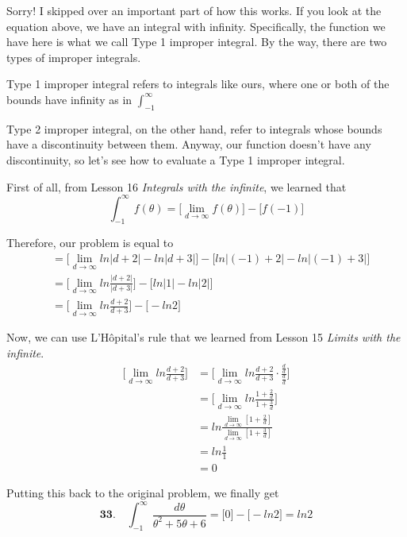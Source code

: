 Sorry! I skipped over an important
part of how this works. If you look at
the equation above, we have an integral
with infinity. Specifically,
the function we have here is what
we call Type 1 improper integral.
By the way, there are two types of
improper integrals. 

Type 1 improper
integral refers to integrals like
ours, where one or both of the bounds
have infinity as in $ \int_{-1}^{\infty} $

Type 2 improper integral, on the other hand,
refer to integrals whose bounds
have a discontinuity between them.
Anyway, our function doesn't have any
discontinuity, so let's see how to
evaluate a Type 1 improper integral.

First of all, from Lesson 16
\textit{Integrals with the infinite},
we learned that
\begin{equation}
    \int_{-1}^{\infty} f(\theta) =
	\Big[    
	  \lim_{d \to \infty} f(\theta)
	\Big]
	- 
	\Big[ 
	  f(-1)
	\Big]
\end{equation}

Therefore, our problem is equal to
\begin{align}
	&= 
	\Big[ 
	  \lim_{d \to \infty} ln|d + 2| - ln|d + 3|
	\Big]
	- 
	\Big[ 
	  ln|(-1) + 2| - ln|(-1) + 3|
	\Big] \\
	&=
	\Big[ 
      \lim_{d \to \infty} 
      ln\frac{|d + 2|}{|d + 3|}
    \Big]
    - 
    \Big[ 
      ln|1| - ln|2|
    \Big] \\
	&=
	\Big[ 
      \lim_{d \to \infty} 
      ln\frac{d + 2}{d + 3}
    \Big]
    - 
    \Big[ 
      - ln2
    \Big]
\end{align}

Now, we can use L'Hôpital's rule that
we learned from Lesson 15
\textit{Limits with the infinite}.
\begin{align}
	\Big[
      \lim_{d \to \infty} 
	  ln\frac{d + 2}{d + 3} 
	\Big]
	&=
	\Big[
	  \lim_{d \to \infty} 
	  ln\frac{d + 2}{d + 3} \cdot
	  \frac{\frac{d}{d}}{\frac{d}{d}} 
	\Big] \\
	&=
	\Big[
	  \lim_{d \to \infty}
	  ln\frac{1+\frac{2}{d}}{1+\frac{3}{d}} 
	\Big] \\
	&=
	ln
	\frac{
	  \lim_{d \to \infty} 	
	  \left[
	      1+\frac{2}{d}
	  \right]
	}{
	  \lim_{d \to \infty} 
	  \left[
	    1+\frac{3}{d} 
	  \right]
	} \\
    &=
    ln
    \frac{1}{1} \\
    &= 0
\end{align}

Putting this back to the original problem,
we finally get
\begin{equation}
	\textbf{33.}\quad \int_{-1}^{\infty} 
	\frac{d\theta}{\theta^2+5\theta+6}
	=
	\Big[0\Big]
	- 
	\Big[ -ln2 \Big]	
	= ln2
\end{equation}

